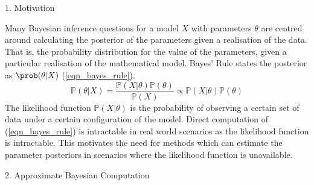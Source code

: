 \documentclass[ %
                  author={Dominic Hutchinson},
                supervisor={Dr. Daniel Lawson \& Dr. Sam Tickle},
                    degree={MEng Maths and Computer Science},
                     title={Bayesian Modelling of Epidemic Events},
                  subtitle={Summary Statistic Selection for Approximate Bayesian Computation Methods},
                      type={},
                      year={2021}
               ]{poster}
\begin{document}

\begin{frame}{}

  \vfill

  \begin{columns}[t]

    \begin{column}{0.475\linewidth}

      \begin{block}{\Large 1. Motivation}

        Many Bayesian inference questions for a model $X$ with parameters $\theta$ are centred around calculating the posterior of the parameters given a realisation of the data. That is, the probability distribution for the value of the parameters, given a particular realisation of the mathematical model. Bayes' Rule states the posterior as $\prob(\theta|X)$ (\ref{eqn_bayes_rule}).
        \begin{equation}\label{eqn_bayes_rule}
          \mathbb{P}(\theta|X)=\frac{\mathbb{P}(X|\theta)\mathbb{P}(\theta)}{\mathbb{P}(X)}\propto\mathbb{P}(X|\theta)\mathbb{P}(\theta)
        \end{equation}
        The likelihood function $\mathbb{P}(X|\theta)$ is the probability of observing a certain set of data under a certain configuration of the model. Direct computation of (\ref{eqn_bayes_rule}) is intractable in real world scenarios as the likelihood function is intractable. This motivates the need for methods which can estimate the parameter posteriors in scenarios where the likelihood function is unavailable.

      \end{block}

      \begin{block}{\Large 2. Approximate Bayesian Computation}


\end{block}
\end{column}
\end{columns}
\end{frame}
\end{document}
